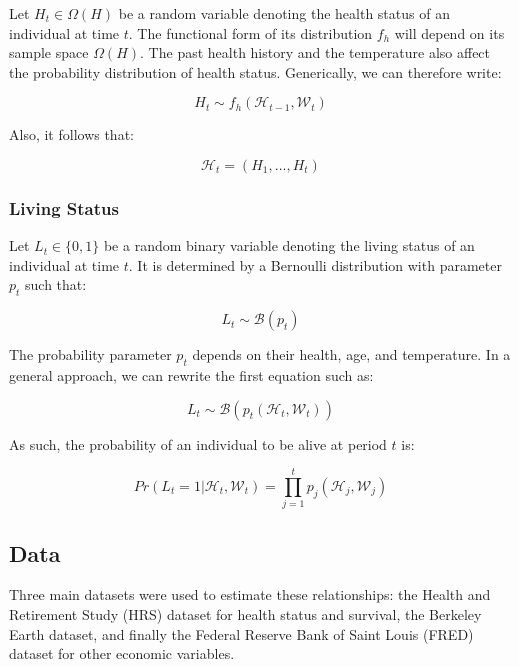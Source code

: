 \documentclass{article}
\begin{document}
Let $H_{t}\in\Omega(H)$ be a random variable denoting the health status of an individual at time $t$.
The functional form of its distribution $f_{h}$ will depend on its sample space $\Omega(H)$. 
The past health history and the temperature also affect the probability distribution of health status.
Generically, we can therefore write: 

\begin{equation}
    H_{t}\sim f_{h}(\mathcal{H}_{t-1},\mathcal{W}_t)
\end{equation}

Also, it follows that: 

\begin{equation}
    \mathcal{H}_{t} = (H_{1},...,H_{t})
\end{equation}

\subsubsection{Living Status}

Let $L_{t}\in\{0,1\}$ be a random binary variable denoting the living status of an individual at time $t$.
It is determined by a Bernoulli distribution with parameter $p_t$ such that: 

\begin{equation}
    L_{t} \sim \mathcal{B}(p_{t})
\end{equation}

The probability parameter $p_{t}$ depends on their health, age, and temperature.
In a general approach, we can rewrite the first equation such as: 

\begin{equation}
    L_{t} \sim \mathcal{B}(p_{t}(\mathcal{H}_t,\mathcal{W}_t))
\end{equation}

As such, the probability of an individual to be alive at period $t$ is: 

\begin{equation}
    Pr(L_t = 1 | \mathcal{H}_t,\mathcal{W}_t ) = \prod_{j = 1}^{t} p_{j}(\mathcal{H}_j,\mathcal{W}_j)
\end{equation}

\subsection{Data}

Three main datasets were used to estimate these relationships: 
the Health and Retirement Study (HRS) dataset for
health status and survival,
the Berkeley Earth dataset,
and finally the Federal Reserve Bank of Saint Louis (FRED) dataset for 
other economic variables.
\end{document}

